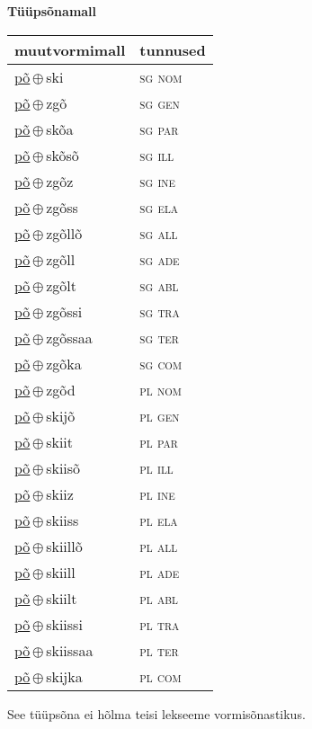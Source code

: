 

\vspace{3.5em}
\noindent \begin{minipage}{\textwidth}
\noindent \textbf{Tüüpsõnamall \,}\\

\begin{sideways}
\begin{tabular}{l l}
muutvormimall & tunnused \\
\hline
\underline{põ}\,$\oplus$\,ski & \textsc{ sg nom } \\
\underline{põ}\,$\oplus$\,zgõ & \textsc{ sg gen } \\
\underline{põ}\,$\oplus$\,skõa & \textsc{ sg par } \\
\underline{põ}\,$\oplus$\,skõsõ & \textsc{ sg ill } \\
\underline{põ}\,$\oplus$\,zgõz & \textsc{ sg ine } \\
\underline{põ}\,$\oplus$\,zgõss & \textsc{ sg ela } \\
\underline{põ}\,$\oplus$\,zgõllõ & \textsc{ sg all } \\
\underline{põ}\,$\oplus$\,zgõll & \textsc{ sg ade } \\
\underline{põ}\,$\oplus$\,zgõlt & \textsc{ sg abl } \\
\underline{põ}\,$\oplus$\,zgõssi & \textsc{ sg tra } \\
\underline{põ}\,$\oplus$\,zgõssaa & \textsc{ sg ter } \\
\underline{põ}\,$\oplus$\,zgõka & \textsc{ sg com } \\
\underline{põ}\,$\oplus$\,zgõd & \textsc{ pl nom } \\
\underline{põ}\,$\oplus$\,skijõ & \textsc{ pl gen } \\
\underline{põ}\,$\oplus$\,skiit & \textsc{ pl par } \\
\underline{põ}\,$\oplus$\,skiisõ & \textsc{ pl ill } \\
\underline{põ}\,$\oplus$\,skiiz & \textsc{ pl ine } \\
\underline{põ}\,$\oplus$\,skiiss & \textsc{ pl ela } \\
\underline{põ}\,$\oplus$\,skiillõ & \textsc{ pl all } \\
\underline{põ}\,$\oplus$\,skiill & \textsc{ pl ade } \\
\underline{põ}\,$\oplus$\,skiilt & \textsc{ pl abl } \\
\underline{põ}\,$\oplus$\,skiissi & \textsc{ pl tra } \\
\underline{põ}\,$\oplus$\,skiissaa & \textsc{ pl ter } \\
\underline{põ}\,$\oplus$\,skijka & \textsc{ pl com } \\
\end{tabular}
\end{sideways}
\label{tab:tüüpsõnamall-põski}

\end{minipage}

 
\vspace{1em}
\noindent See tüüpsõna ei hõlma teisi lekseeme vormi\-sõnastikus.
